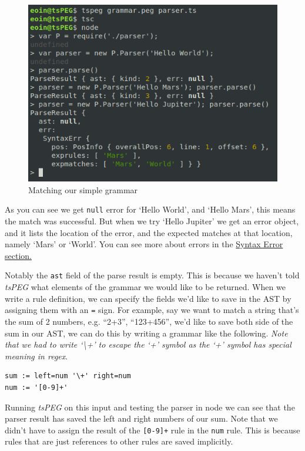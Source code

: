 \begin{figure}[ht]
\caption{Matching our simple grammar}
\label{basictspegexample}
\centering
\includegraphics[scale=0.7]{src/app1assets/example1.png}
\end{figure}

As you can see we get \texttt{null} error for `Hello World', and `Hello
Mars', this means the match was successful. But when we try `Hello
Jupiter' we get an error object, and it lists the location of the error,
and the expected matches at that location, namely `Mars' or `World'. You
can see more about errors in the
\protect\hyperlink{syntax-errors}{Syntax Error section.}

Notably the \texttt{ast} field of the parse result is empty. This is
because we haven't told \emph{tsPEG} what elements of the grammar we
would like to be returned. When we write a rule definition, we can
specify the fields we'd like to save in the AST by assigning them with
an \texttt{=} sign. For example, say we want to match a string that's
the sum of 2 numbers, e.g. ``2+3'', ``123+456'', we'd like to save both
side of the sum in our AST, we can do this by writing a grammar like the
following. \emph{Note that we had to write `\textbackslash{}+' to escape
the `+' symbol as the `+' symbol has special meaning in regex}.

\begin{verbatim}
sum := left=num '\+' right=num
num := '[0-9]+'
\end{verbatim}

Running \emph{tsPEG} on this input and testing the parser in node we can
see that the parser result has saved the left and right numbers of our
sum. Note that we didn't have to assign the result of the
\texttt{{[}0-9{]}+} rule in the \texttt{num} rule. This is because rules
that are just references to other rules are saved implicitly.

